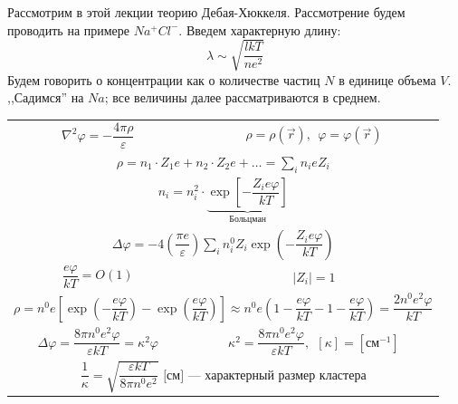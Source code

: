 
\begin{lecture}
	Рассмотрим в этой лекции теорию Дебая-Хюккеля. Рассмотрение будем проводить на примере $ Na^+ Cl^- $. Введем характерную длину:
	\begin{equation}
	\lambda \sim \sqrt{\dfrac{l kT}{ne^2}}
	\label{eq:debay_lambda}
	\end{equation}
	Будем говорить о концентрации как о количестве частиц $ N $ в единице объема $ V $. ,,Садимся'' на $ Na $; все величины далее рассматриваются в среднем.
	
	\begin{center}\begin{tabular}{cc}
		$ \nabla^2 \varphi = - \dfrac{4 \pi \rho}{\varepsilon} $ & $ \rho = \rho (\vec{r}), ~~ \varphi = \varphi (\vec{r}) $ \\
		\multicolumn{2}{c}{$ \rho = n_1 \cdot Z_1 e + n_2 \cdot Z_2 e + \dots = \sum\limits_i n_i e Z_i $} \\
		\multicolumn{2}{c}{$ n_i = n_i^2 \cdot \underbrace{\exp\left[ - \dfrac{Z_i e \varphi}{kT} \right]}_{\text{Больцман}} $} \\
		\multicolumn{2}{c}{$ \Delta \varphi = -4 \left( \dfrac{\pi e}{\varepsilon} \right) \displaystyle \sum\limits_i n_i^0 Z_i \exp\left( -\dfrac{Z_i e \varphi}{kT} \right) $} \\
		\hfill$ \dfrac{e \varphi}{kT} = O(1) $ & $ |Z_i| = 1 $ \\
		\multicolumn{2}{c}{$ \rho = n^0 e \left[ \exp\left( -\dfrac{e \varphi}{kT} \right) - \exp\left( \dfrac{e \varphi}{kT} \right) \right] \approx n^0 e \left( 1 - \dfrac{e \varphi}{kT} - 1 - \dfrac{e \varphi}{kT} \right) = \dfrac{2 n^0 e^2 \varphi}{kT} $} \\
		$ \Delta \varphi = \dfrac{8 \pi n^0 e^2 \varphi }{\varepsilon kT} = \kappa^2 \varphi $ & $ \kappa^2 = \dfrac{8 \pi n^0 e^2 \varphi }{\varepsilon kT}, ~~ [\kappa] = [\text{см}^{-1}] $ \\
		\multicolumn{2}{c}{$ \dfrac{1}{\kappa} = \sqrt{\dfrac{\varepsilon kT}{8 \pi n^0 e^2}} \text{ [см] --- характерный размер кластера} $}
	\end{tabular}\end{center}
	

\end{lecture}
